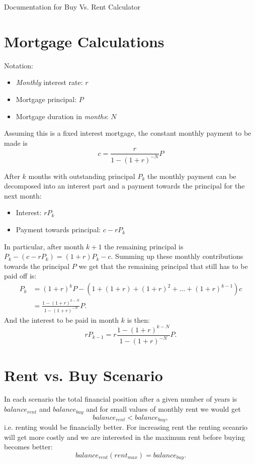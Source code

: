 \documentclass{article}
\begin{document}
\vspace*{0.5cm}
{\centering \LARGE Documentation for Buy Vs. Rent Calculator \par}
\vspace{0.8cm}


\section{Mortgage Calculations}
Notation:
\begin{itemize}
	\item \emph{Monthly} interest rate: $r$
	\item Mortgage principal: $P$
	\item Mortgage duration in \emph{months}: $N$
\end{itemize}

Assuming this is a fixed interest mortgage, the constant monthly payment to be made is
\begin{equation}
	\label{monthly_payment}
	c = \frac{r}{1 - \left(1 + r\right)^{-N}}P
\end{equation}

After $k$ months with outstanding principal $P_k$ the monthly payment can be decomposed into
an interest part and a payment towards the principal for the next month:
\begin{itemize}
	\item Interest: $r P_k$
	\item Payment towards principal: $c - r P_k$
\end{itemize}
In particular, after month $k + 1$ the remaining principal is $P_k - (c -r P_k) = (1 + r)P_k - c$.
Summing up these monthly contributions towards the principal $P$ we get that the remaining principal that still has to be paid off is:
\begin{align}
	\label{rem_prin}
	P_k &= (1 + r)^k P - \left(1 + (1 + r) + (1 + r)^2 + \dots + (1 + r)^{k-1}\right)c \\
		&= \frac{1 - (1 + r)^{k - N}}{1 - (1 + r)^{-N}}P.
\end{align}
And the interest to be paid in month $k$ is then:
\begin{equation}
	r P_{k - 1} = r \frac{1 - (1 + r)^{k - N}}{1 - (1 + r)^{-N}}P.
\end{equation}


\section{Rent vs. Buy Scenario}
In each scenario the total financial position after a given number of years is
$balance_{rent}$ and $balance_{buy}$ and for small values of monthly rent we would get
\begin{equation}
	balance_{rent} < balance_{buy},
\end{equation}
i.e. renting would be financially better. For increasing rent the renting sceanrio will get more costly and we are interested in the maximum rent before buying becomes better:
\begin{equation}
	balance_{rent}(rent_{max}) = balance_{buy}.
\end{equation}
\end{document}
